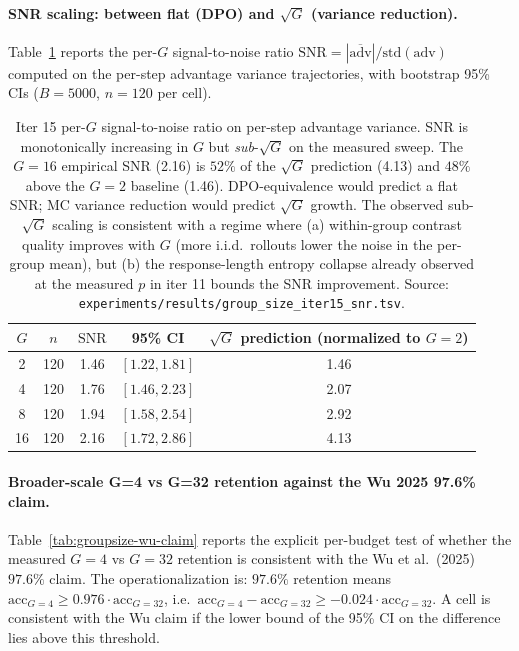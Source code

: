 \paragraph{SNR scaling: between flat (DPO) and $\sqrt{G}$ (variance
reduction).}
Table~\ref{tab:groupsize-snr} reports the per-$G$ signal-to-noise
ratio $\mathrm{SNR} = |\overline{\mathrm{adv}}| / \mathrm{std}(
\mathrm{adv})$ computed on the per-step advantage variance
trajectories, with bootstrap 95\% CIs ($B{=}5000$, $n{=}120$ per
cell).

\begin{table}[htbp]
\centering
\small
\begin{tabular}{ccccc}
\toprule
$G$ & $n$ & $\mathrm{SNR}$ & 95\% CI & $\sqrt{G}$ prediction (normalized to $G{=}2$) \\
\midrule
2  & 120 & 1.46 & $[1.22, 1.81]$ & 1.46 \\
4  & 120 & 1.76 & $[1.46, 2.23]$ & 2.07 \\
8  & 120 & 1.94 & $[1.58, 2.54]$ & 2.92 \\
16 & 120 & 2.16 & $[1.72, 2.86]$ & 4.13 \\
\bottomrule
\end{tabular}
\caption{Iter 15 per-$G$ signal-to-noise ratio on per-step advantage
variance. SNR is monotonically increasing in $G$ but \emph{sub}-$\sqrt{G}$
on the measured sweep. The $G{=}16$ empirical SNR (2.16) is $52\%$ of
the $\sqrt{G}$ prediction (4.13) and $48\%$ above the $G{=}2$
baseline (1.46). DPO-equivalence would predict a flat SNR; MC variance
reduction would predict $\sqrt{G}$ growth. The observed sub-$\sqrt{G}$
scaling is consistent with a regime where (a) within-group contrast
quality improves with $G$ (more i.i.d.\ rollouts lower the noise in
the per-group mean), but (b) the response-length entropy collapse
already observed at the measured $p$ in iter 11 bounds the SNR
improvement. Source:
\texttt{experiments/results/group\_size\_iter15\_snr.tsv}.}
\label{tab:groupsize-snr}
\end{table}

\paragraph{Broader-scale G=4 vs G=32 retention against the Wu 2025 97.6\%
claim.}
Table~\ref{tab:groupsize-wu-claim} reports the explicit per-budget
test of whether the measured $G{=}4$ vs $G{=}32$ retention is
consistent with the Wu et al.\ (2025) $97.6\%$ claim. The
operationalization is: $97.6\%$ retention means
$\mathrm{acc}_{G{=}4} \ge 0.976 \cdot \mathrm{acc}_{G{=}32}$, i.e.\
$\mathrm{acc}_{G{=}4} - \mathrm{acc}_{G{=}32} \ge -0.024 \cdot
\mathrm{acc}_{G{=}32}$. A cell is consistent with the Wu claim if
the lower bound of the 95\% CI on the difference lies above this
threshold.

